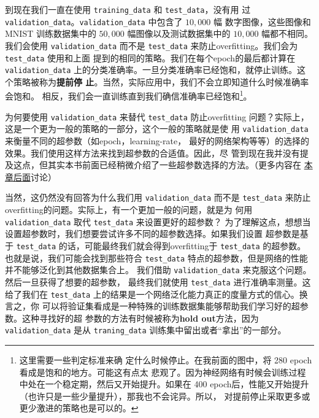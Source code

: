 到现在我们一直在使用 \lstinline!training_data! 和 \lstinline!test_data!，没有用
过 \lstinline!validation_data!。\lstinline!validation_data! 中包含了 $10,000$ 幅
数字图像，这些图像和 MNIST 训练数据集中的 $50,000$ 幅图像以及测试数据集中的
$10,000$ 幅都不相同。我们会使用 \lstinline!validation_data! 而不是
\lstinline!test_data! 来防止\gls*{overfitting}。我们会为 \lstinline!test_data! 使用和上面
提到的相同的策略。我们在每个\gls*{epoch}的最后都计算在 \lstinline!validation_data!
上的分类准确率。一旦分类准确率已经饱和，就停止训练。这个策略被称为\textbf{提前停
  止}。当然，实际应用中，我们不会立即知道什么时候准确率会饱和。
相反，我们会一直训练直到我们确信准确率已经饱和\footnote{这里需要一些判定标准来确
  定什么时候停止。在我前面的图中，将 280 \gls*{epoch}看成是饱和的地方。可能这有点太
  悲观了。因为神经网络有时候会训练过程中处在一个稳定期，然后又开始提升。如果在
  400 \gls*{epoch}后，性能又开始提升（也许只是一些少量提升），那我也不会诧异。所以，
  对提前停止采取更多或更少激进的策略也是可以的。}。

\label{validation_explanation}
为何要使用 \lstinline!validation_data! 来替代 \lstinline!test_data! 防止\gls*{overfitting}
问题？实际上，这是一个更为一般的策略的一部分，这个一般的策略就是使
用 \lstinline!validation_data! 来衡量不同的超参数（如\gls*{epoch}，\gls*{learning-rate}，
最好的网络架构等等）的选择的效果。我们使用这样方法来找到超参数的合适值。因此，尽
管到现在我并没有提及这点，但其实本书前面已经稍微介绍了一些超参数选择的方法。（更多内容在%
\hyperref[sec:how_to_choose_a_neural_network's_hyper-parameters]{本章后面}讨论）

当然，这仍然没有回答为什么我们用 \lstinline!validation_data! 而不是
\lstinline!test_data! 来防止\gls*{overfitting}的问题。实际上，有一个更加一般的问题，就是为
何用 \lstinline!validation_data! 取代 \lstinline!test_data! 来设置更好的超参数？
为了理解这点，想想当设置超参数时，我们想要尝试许多不同的超参数选择。如果我们设置
超参数是基于 \lstinline!test_data! 的话，可能最终我们就会得到\gls*{overfitting}于
\lstinline!test_data!  的超参数。也就是说，我们可能会找到那些符合
\lstinline!test_data! 特点的超参数，但是网络的性能并不能够泛化到其他数据集合上。
我们借助 \lstinline!validation_data! 来克服这个问题。然后一旦获得了想要的超参数，
最终我们就使用 \lstinline!test_data! 进行准确率测量。这给了我们在
\lstinline!test_data! 上的结果是一个网络泛化能力真正的度量方式的信心。换言之，你
可以将验证集看成是一种特殊的训练数据集能够帮助我们学习好的超参数。这种寻找好的超
参数的方法有时候被称为\textbf{hold out}方法，因为 \lstinline!validation_data! 是从
\lstinline!traning_data! 训练集中留出或者“拿出”的一部分。

